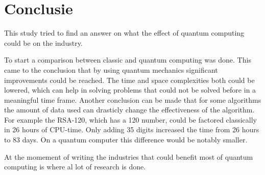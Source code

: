 
\chapter{Conclusie}
\label{ch:conclusie}


This study tried to find an answer on what the effect of quantum computing could be on the industry.

To start a comparison between classic and quantum computing was done. This came to the conclusion that by using quantum mechanics significant improvements could be reached.
The time and space complexities both could be lowered, which can help in solving problems that could not be solved before in a meaningful time frame.
Another conclusion can be made that for some algorithms the amount of data used can drasticly change the effectiveness of the algorithm. For example the RSA-120, which has a 120 number, could be factored classically in 26 hours of CPU-time.
Only adding 35 digits increased the time from 26 hours to 83 days. On a quantum computer this difference would be notably smaller.

At the momement of writing the industries that could benefit most of quantum computing is where al lot of research is done.

